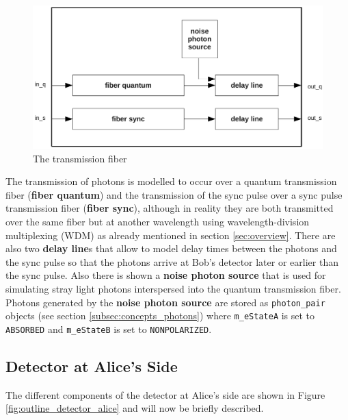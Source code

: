 \begin{figure}[h]
\centering
\includegraphics[scale=0.65]{drawings/fiber.pdf}
\caption{The transmission fiber}
\label{fig:outline_fiber}
\end{figure}

The transmission of photons is modelled to occur over a quantum transmission fiber (\textbf{fiber quantum}) and the transmission of the sync pulse over a sync pulse transmission fiber (\textbf{fiber sync}), although in reality they are both transmitted over the same fiber but at another wavelength using wavelength-division multiplexing (WDM) as already mentioned in section \ref{sec:overview}. There are also two \textbf{delay line}s that allow to model delay times between the photons and the sync pulse so that the photons arrive at Bob's detector later or earlier than the sync pulse. Also there is shown a \textbf{noise photon source} that is used for simulating stray light photons interspersed into the quantum transmission fiber. Photons generated by the \textbf{noise photon source} are stored as \texttt{photon\_pair} objects (see section \ref{subsec:concepts_photons}) where \texttt{m\_eStateA} is set to \texttt{ABSORBED} and \texttt{m\_eStateB} is set to \texttt{NONPOLARIZED}.

\subsection{Detector at Alice's Side}
\label{subsec:outline_detector_alice}

The different components of the detector at Alice's side are shown in Figure \ref{fig:outline_detector_alice} and will now be briefly described.

